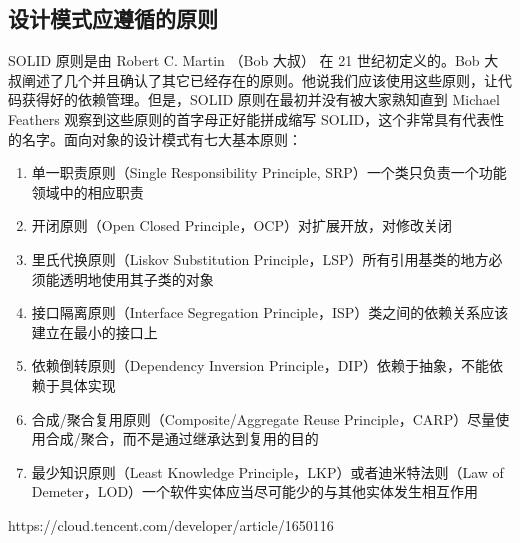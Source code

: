 \documentclass[../../../interview-questions.tex]{subfiles}
\begin{document}
\subsection{设计模式应遵循的原则}

SOLID 原则是由 Robert C. Martin （Bob 大叔） 在 21 世纪初定义的。Bob 大叔阐述了几个并且确认了其它已经存在的原则。他说我们应该使用这些原则，让代码获得好的依赖管理。但是，SOLID 原则在最初并没有被大家熟知直到 Michael Feathers 观察到这些原则的首字母正好能拼成缩写 SOLID，这个非常具有代表性的名字。面向对象的设计模式有七大基本原则：

\begin{enumerate}
    \item {单一职责原则（Single Responsibility Principle, SRP）}一个类只负责一个功能领域中的相应职责
    \item {开闭原则（Open Closed Principle，OCP）}对扩展开放，对修改关闭
    \item {里氏代换原则（Liskov Substitution Principle，LSP）}所有引用基类的地方必须能透明地使用其子类的对象
    \item {接口隔离原则（Interface Segregation Principle，ISP）}类之间的依赖关系应该建立在最小的接口上
    \item {依赖倒转原则（Dependency Inversion Principle，DIP）}依赖于抽象，不能依赖于具体实现
    \item {合成/聚合复用原则（Composite/Aggregate Reuse Principle，CARP）}尽量使用合成/聚合，而不是通过继承达到复用的目的
    \item {最少知识原则（Least Knowledge Principle，LKP）或者迪米特法则（Law of  Demeter，LOD）}一个软件实体应当尽可能少的与其他实体发生相互作用
\end{enumerate}

https://cloud.tencent.com/developer/article/1650116
\end{document}

